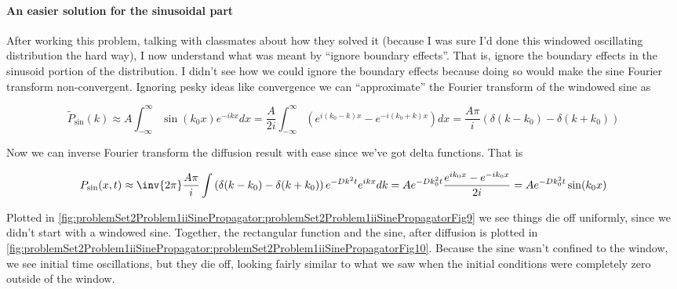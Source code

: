 {

\paragraph{An easier solution for the sinusoidal part}

After working this problem, talking with classmates about how they solved it (because I was sure I'd done this windowed oscillating distribution the hard way), I now understand what was meant by ``ignore boundary effects''.  That is, ignore the boundary effects in the sinusoid portion of the distribution.  I didn't see how we could ignore the boundary effects because doing so would make the sine Fourier transform non-convergent.  Ignoring pesky ideas like convergence we can ``approximate'' the Fourier transform of the windowed sine as

\begin{dmath}\label{eqn:basicStatMechProblemSet2Problem1:600}
\tilde{P}_{\mathrm{sin}}(k)
\approx
A \int_{-\infty}^\infty \sin (k_0 x) e^{-i k x} dx
=
\frac{A }{2 i}
\int_{-\infty}^\infty
\left(
e^{i (k_0 - k) x}
-e^{-i (k_0 + k) x} \right)
dx
=
\frac{A \pi}{i} \left(
\delta(k - k_0) - \delta(k + k_0)
\right)
\end{dmath}

Now we can inverse Fourier transform the diffusion result with ease since we've got delta functions.  That is

\begin{dmath}\label{eqn:basicStatMechProblemSet2Problem1:620}
P_{\mathrm{sin}}(x, t) \approx
\inv{2 \pi}
\frac{A \pi}{i}
\int
\left(
\delta(k - k_0) - \delta(k + k_0)
\right)
e^{-D k^2 t} e^{i k x} dk
=
A e^{-D k_0^2 t} \frac{ e^{i k_0 x} - e^{-i k_0 x}}{2 i}
=
A e^{-D k_0^2 t} \sin( k_0 x )
\end{dmath}

Plotted in \cref{fig:problemSet2Problem1iiSinePropagator:problemSet2Problem1iiSinePropagatorFig9} we see things die off uniformly, since we didn't start with a windowed sine.  Together, the rectangular function and the sine, after diffusion is plotted in \cref{fig:problemSet2Problem1iiSinePropagator:problemSet2Problem1iiSinePropagatorFig10}.  Because the sine wasn't confined to the window, we see initial time oscillations, but they die off, looking fairly similar to what we saw when the initial conditions were completely zero outside of the window.

}
